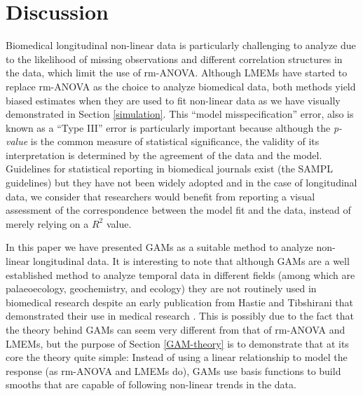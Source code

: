 \documentclass[Royal,times,doublespace,sagev]{sagej}
\begin{document}
\hypertarget{discussion}{%
\section{Discussion}\label{discussion}}

Biomedical longitudinal non-linear data is particularly challenging to analyze due to the likelihood of missing observations and different correlation structures in the data, which limit the use of rm-ANOVA. Although LMEMs have started to replace rm-ANOVA as the choice to analyze biomedical data, both methods yield biased estimates when they are used to fit non-linear data as we have visually demonstrated in Section \ref{simulation}. This ``model misspecification'' error, also is known as a ``Type III'' error \cite{dennis2019} is particularly important because although the \emph{p-value} is the common measure of statistical significance, the validity of its interpretation is determined by the agreement of the data and the model. Guidelines for statistical reporting in biomedical journals exist (the SAMPL guidelines) \cite{lang2015} but they have not been widely adopted and in the case of longitudinal data, we consider that researchers would benefit from reporting a visual assessment of the correspondence between the model fit and the data, instead of merely relying on a \(R^2\) value.

In this paper we have presented GAMs as a suitable method to analyze non-linear longitudinal data. It is interesting to note that although GAMs are a well established method to analyze temporal data in different fields (among which are palaeoecology, geochemistry, and ecology) \cite{hefley2017, pedersen2019} they are not routinely used in biomedical research despite an early publication from Hastie and Tibshirani that demonstrated their use in medical research \cite{hastie1995}. This is possibly due to the fact that the theory behind GAMs can seem very different from that of rm-ANOVA and LMEMs, but the purpose of Section \ref{GAM-theory} is to demonstrate that at its core the theory quite simple: Instead of using a linear relationship to model the response (as rm-ANOVA and LMEMs do), GAMs use basis functions to build smooths that are capable of following non-linear trends in the data.
\end{document}
